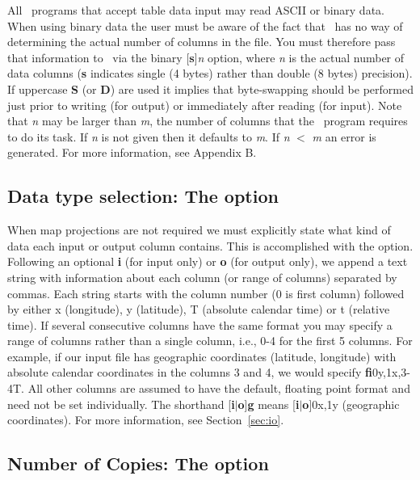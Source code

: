 All \GMT\ programs that accept table data input may read ASCII
or binary data.  When using binary data the user must be aware
of the fact that \GMT\ has no way of determining the actual
number of columns in the file.  You must therefore pass that
information to \GMT\ via the binary [{\bf s}]{\it n} option,
where {\it n} is the actual number of data columns ({\bf s}
indicates single (4 bytes) rather than double (8 bytes) precision).  If uppercase
{\bf S} (or {\bf D}) are used it implies that byte-swapping should be performed
just prior to writing (for output) or immediately after  reading (for input).
Note that {\it n} may be larger than {\it m}, the number of
columns that the \GMT\ program requires to do its task.  If
{\it n} is not given then it defaults to {\it m}.  If
{\it n} $<$ {\it m} an error is generated.  For more information,
see Appendix B.

\subsection{Data type selection: The  option}

When map projections are not required we must explicitly state
what kind of data each input or output column contains.  This is accomplished with
the  option.  Following an optional {\bf i} (for input only) or {\bf o} (for output
only), we append a text string with information about each column (or range of columns) separated by commas.
Each string starts with the column number (0 is first column) followed by either
x (longitude), y (latitude), T (absolute calendar time) or t (relative time).  If
several consecutive columns have the same format you may specify a range of columns
rather than a single column, i.e., 0-4 for the first 5 columns.  For example, if our
input file has geographic coordinates (latitude, longitude) with absolute calendar
coordinates in the columns 3 and 4, we would specify {\bf fi}0y,1x,3-4T.  All other columns
are assumed to have the default, floating point format and need not be set individually.
The shorthand [{\bf i}$|${\bf o}]{\bf g} means [{\bf i}$|${\bf o}]0x,1y (geographic coordinates).
For more information, see Section~\ref{sec:io}.

\subsection{Number of Copies: The  option}

